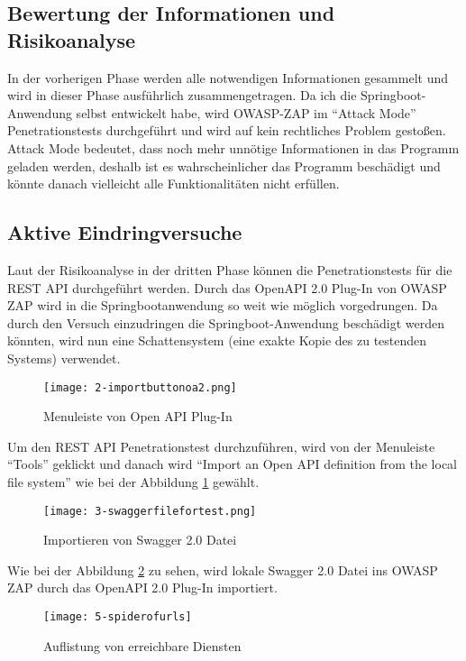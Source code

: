 \subsection{Bewertung der Informationen und Risikoanalyse}

In der vorherigen Phase werden alle notwendigen Informationen gesammelt und wird in dieser Phase ausführlich zusammengetragen.
Da ich die Springboot-Anwendung selbst entwickelt habe, wird OWASP-ZAP im  "`Attack Mode"' Penetrationstests durchgeführt und wird auf kein rechtliches Problem gestoßen. Attack Mode bedeutet, dass noch mehr unnötige Informationen in das Programm geladen werden, deshalb ist es wahrscheinlicher das Programm beschädigt und könnte danach vielleicht alle Funktionalitäten nicht erfüllen.

\subsection{Aktive Eindringversuche}

Laut der Risikoanalyse in der dritten Phase können die Penetrationstests für die REST API durchgeführt werden. Durch das OpenAPI 2.0 Plug-In von OWASP ZAP wird in die Springbootanwendung so weit wie möglich vorgedrungen. Da durch den Versuch einzudringen die Springboot-Anwendung beschädigt werden könnten, wird nun eine Schattensystem (eine exakte Kopie des zu testenden Systems) verwendet.\\

\newpage

\begin{figure}[h]
	\centering
	\texttt{[image: 2-importbuttonoa2.png]}
	\caption{Menuleiste von Open API Plug-In}
	\label{swaggerimport1}
\end{figure}

Um den REST API Penetrationstest durchzuführen, wird von der Menuleiste "`Tools"' geklickt und danach wird "`Import an Open API definition from the local file system"' wie bei der Abbildung \ref{swaggerimport1} gewählt.

\begin{figure}[h]
	\centering
	\texttt{[image: 3-swaggerfilefortest.png]}
	\caption{Importieren von Swagger 2.0 Datei}
	\label{swaggerimport2}
\end{figure}


Wie bei der Abbildung \ref{swaggerimport2} zu sehen, wird lokale Swagger 2.0 Datei ins OWASP ZAP durch das OpenAPI 2.0 Plug-In importiert.

\begin{figure}[h]
	\centering
	\texttt{[image: 5-spiderofurls]}
	\caption{Auflistung von erreichbare Diensten}
	\label{swaggerimport3}
\end{figure}


